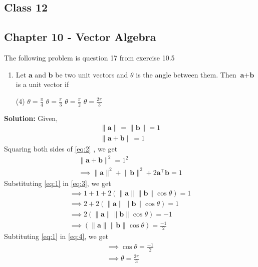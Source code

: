 \documentclass{article}
\newcommand{\solution}{\noindent \textbf{Solution: }}
\newcommand{\norm}[1]{\lVert#1\rVert}
\renewcommand{\vec}[1]{\textbf{#1}}
\begin{document}
\onehalfspacing
\begin{center}
	\section*{\textbf{Class 12}}
	\subsection*{Chapter 10 - Vector Algebra}
\end{center}
The following problem is question 17 from exercise 10.5

\begin{enumerate}
	\item Let $\vec{a}$ and $\vec{b}$ be two unit vectors and $\theta$ is the angle between them. Then $\vec{a}+\vec{b}$ is a unit vector if
		\begin{tasks}(4)
			\task $\theta = \frac{\pi}{4}$
			\task $\theta = \frac{\pi}{3}$
			\task $\theta = \frac{\pi}{2}$
			\task $\theta = \frac{2\pi}{3}$
			\end{tasks}
			
\end{enumerate}
\solution
Given,
\begin{align}
	\norm{\vec{a}}=\norm{\vec{b}}=1\label{eq:1}
	\\
	\norm{\vec{a}+\vec{b}}=1\label{eq:2}
\end{align}
Squaring both sides of \eqref{eq:2}  , we get
\begin{align}
	\norm{\vec{a}+\vec{b}}^2=1^2
\\	
	\implies \norm{\vec{a}}^2 + \norm{\vec{b}}^2 + 2\vec{a}^{\top}\vec{b} = 1\label{eq:3}	
\end{align}
Substituting \eqref{eq:1} in \eqref{eq:3}, we get
\\
\begin{align}
	\implies 1+1+2(\norm{\vec{a}}\norm{\vec{b}}\cos{\theta})=1
	\\
	\implies 2+2(\norm{\vec{a}}\norm{\vec{b}}\cos{\theta})=1
        \\
	\implies 2(\norm{\vec{a}}\norm{\vec{b}}\cos{\theta})=-1
	\\
	\implies (\norm{\vec{a}}\norm{\vec{b}}\cos{\theta})=\frac{-1}{2}\label{eq:4}
\end{align}
Subtituting \eqref{eq:1} in \eqref{eq:4}, we get
\begin{align}
	\implies \cos{\theta}=\frac{-1}{2}
	\\
	\implies \theta=\frac{2\pi}{3}
\end{align}
\end{document}
